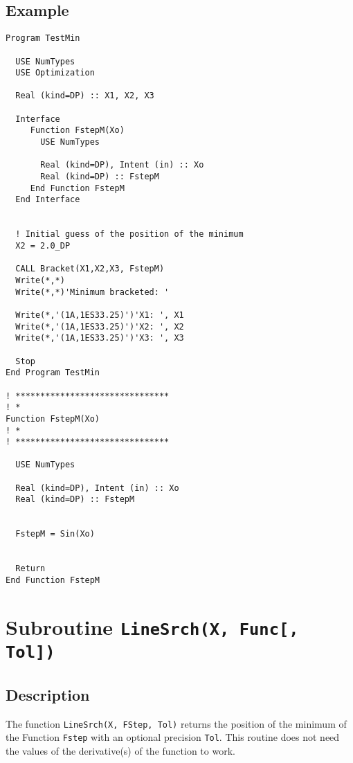 \subsection{Example}

\begin{lstlisting}[emph=Bracket,
                   emphstyle=\color{blue},
                   frame=trBL,
                   caption=Bracketing a minimum.,
                   label=Bracket]
Program TestMin

  USE NumTypes
  USE Optimization

  Real (kind=DP) :: X1, X2, X3
  
  Interface
     Function FstepM(Xo)
       USE NumTypes
       
       Real (kind=DP), Intent (in) :: Xo
       Real (kind=DP) :: FstepM
     End Function FstepM
  End Interface
  

  ! Initial guess of the position of the minimum
  X2 = 2.0_DP

  CALL Bracket(X1,X2,X3, FstepM)
  Write(*,*)
  Write(*,*)'Minimum bracketed: '
  
  Write(*,'(1A,1ES33.25)')'X1: ', X1
  Write(*,'(1A,1ES33.25)')'X2: ', X2
  Write(*,'(1A,1ES33.25)')'X3: ', X3

  Stop
End Program TestMin

! *******************************
! *
Function FstepM(Xo)
! *
! *******************************

  USE NumTypes
  
  Real (kind=DP), Intent (in) :: Xo
  Real (kind=DP) :: FstepM

  
  FstepM = Sin(Xo)


  Return
End Function FstepM
\end{lstlisting}


\section{Subroutine \texttt{LineSrch(X, Func[, Tol]) }}

\subsection{Description}

The function \texttt{LineSrch(X, FStep, Tol)} returns the position of the
minimum of the Function \texttt{Fstep} with an optional precision
\texttt{Tol}. This routine does not need the values of the
derivative(s) of the function to work.

